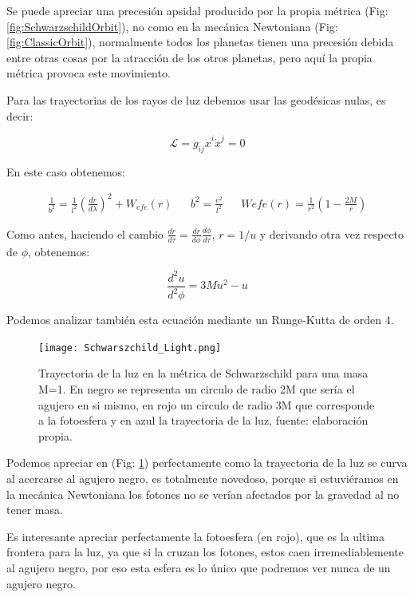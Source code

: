 \documentclass{article}
\begin{document}
Se puede apreciar una precesión apsidal producido por la propia métrica (Fig: \ref{fig:SchwarzschildOrbit}), no como en la mecánica Newtoniana (Fig: \ref{fig:ClassicOrbit}), normalmente todos los planetas tienen una precesión debida entre otras cosas por la atracción de los otros planetas, pero aquí la propia métrica provoca este movimiento.

Para las trayectorias de los rayos de luz debemos usar las geodésicas nulas, es decir:\cite{zamorageodesicas}

\begin{equation}
    \mathcal{L}=g_{ij}\dot x^{i}\dot x^{j}=0
\end{equation}

En este caso obtenemos:\cite{zamorageodesicas}

\begin{align}\label{23}
    \frac{1}{b^{2}}=\frac{1}{l^{2}}\left(\frac{dr}{d\lambda}\right)^{2}+W_{efe}(r)
    && b^{2}=\frac{e^{2}}{l^{2}} && Wefe(r)=\frac{1}{r^{2}}\left(1-\frac{2M}{r}\right)
\end{align}

Como antes, haciendo el cambio $\frac{dr}{d\tau}=\frac{dr}{d\phi}\frac{d\phi}{d\tau}$, $r=1/u$ y derivando otra vez respecto de $\phi$, obtenemos:\cite{zamorageodesicas}

\begin{equation}
    \frac{d^{2}u}{d^{2}\phi}=3Mu^{2}-u
\end{equation}

Podemos analizar también esta ecuación mediante un Runge-Kutta de orden 4.

\begin{figure}[H]\label{S_light}
    \centering
    \texttt{[image: Schwarszchild\_Light.png]}
    \caption{Trayectoria de la luz en la métrica de Schwarzschild para una masa M=1. En negro se representa un circulo de radio 2M que sería el agujero en si mismo, en rojo un circulo de radio 3M que corresponde a la fotoesfera y en azul la trayectoria de la luz, fuente: elaboración propia.}
    \label{fig:S_light}
\end{figure}
Podemos apreciar en (Fig: \ref{fig:S_light}) perfectamente como la trayectoria de la luz se curva al acercarse al agujero negro, es totalmente novedoso, porque si estuviéramos en la mecánica Newtoniana los fotones no se verían afectados por la gravedad al no tener masa.

Es interesante apreciar perfectamente la fotoesfera (en rojo), que es la ultima frontera para la luz, ya que si la cruzan los fotones, estos caen irremediablemente al agujero negro, por eso esta esfera es lo único que podremos ver nunca de un agujero negro. 
\end{document}
